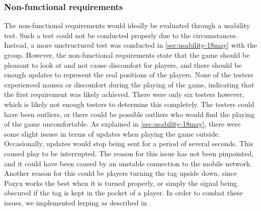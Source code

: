 \subsubsection{Non-functional requirements}
The non-functional requirements would ideally be evaluated through a usability test.
Such a test could not be conducted properly due to the circumstances.
Instead, a more unstructured test was conducted in \autoref{sec:usability-18may} with the group.
However, the non-functional requirements state that the game should be pleasant to look at and not cause discomfort for players, and there should be enough updates to represent the real positions of the players.
None of the testers experienced nausea or discomfort during the playing of the game, indicating that the first requirement was likely achieved.
There were only six testers however, which is likely not enough testers to determine this completely.
The testers could have been outliers, or there could be possible outliers who would find the playing of the game uncomfortable.
As explained in \autoref{sec:usability-18may}, there were some slight issues in terms of updates when playing the game outside.
Occasionally, updates would stop being sent for a period of several seconds.
This caused play to be interrupted.
The reason for this issue has not been pinpointed, and it could have been caused by an unstable connection to the mobile network.
Another reason for this could be players turning the tag upside down, since Pozyx works the best when it is turned properly\cite{pozyx-AnchorHeights}, or simply the signal being obscured if the tag is kept in the pocket of a player.
In order to combat these issues, we implemented lerping as described in .
